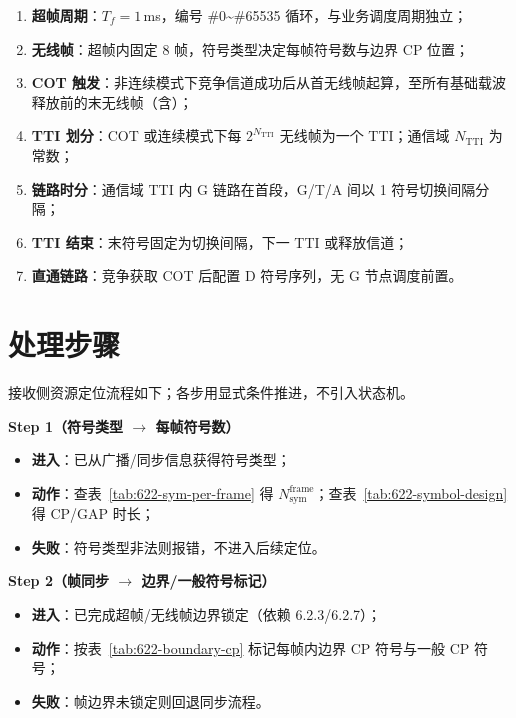 \documentclass[11pt,a4paper]{ctexart}
\begin{document}
\begin{enumerate}[nosep]
  \item \textbf{超帧周期}：$T_f = 1$\,ms，编号 \#0\textasciitilde\#65535 循环，与业务调度周期独立；
  \item \textbf{无线帧}：超帧内固定 8 帧，符号类型决定每帧符号数与边界 CP 位置；
  \item \textbf{COT 触发}：非连续模式下竞争信道成功后从首无线帧起算，至所有基础载波释放前的末无线帧（含）；
  \item \textbf{TTI 划分}：COT 或连续模式下每 $2^{N_{\mathrm{TTI}}}$ 无线帧为一个 TTI；通信域 $N_{\mathrm{TTI}}$ 为常数；
  \item \textbf{链路时分}：通信域 TTI 内 G 链路在首段，G/T/A 间以 1 符号切换间隔分隔；
  \item \textbf{TTI 结束}：末符号固定为切换间隔，下一 TTI 或释放信道；
  \item \textbf{直通链路}：竞争获取 COT 后配置 D 符号序列，无 G 节点调度前置。
\end{enumerate}

\section{处理步骤}

接收侧资源定位流程如下；各步用显式条件推进，不引入状态机。

\textbf{Step 1（符号类型 $\rightarrow$ 每帧符号数）}
\begin{itemize}[nosep]
  \item \textbf{进入}：已从广播/同步信息获得符号类型；
  \item \textbf{动作}：查表~\ref{tab:622-sym-per-frame} 得 $N_{\mathrm{sym}}^{\mathrm{frame}}$；查表~\ref{tab:622-symbol-design} 得 CP/GAP 时长；
  \item \textbf{失败}：符号类型非法则报错，不进入后续定位。
\end{itemize}

\textbf{Step 2（帧同步 $\rightarrow$ 边界/一般符号标记）}
\begin{itemize}[nosep]
  \item \textbf{进入}：已完成超帧/无线帧边界锁定（依赖 6.2.3/6.2.7）；
  \item \textbf{动作}：按表~\ref{tab:622-boundary-cp} 标记每帧内边界 CP 符号与一般 CP 符号；
  \item \textbf{失败}：帧边界未锁定则回退同步流程。
\end{itemize}
\end{document}
